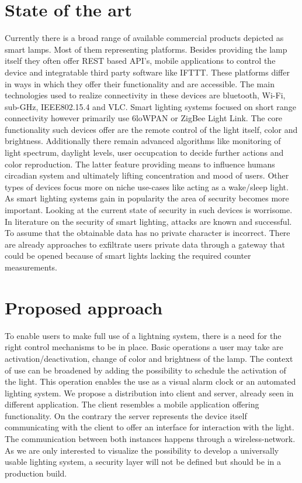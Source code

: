 \documentclass[conference]{IEEEtran}
\begin{document}
\section{State of the art}
Currently there is a broad range of available commercial products depicted as smart lamps. Most of them representing platforms.
Besides providing the lamp itself they often offer REST based API's, mobile applications to control the device and integratable
third party software like IFTTT. These platforms differ in ways in which they offer their functionality and are accessible.
The main technologies used to realize connectivity in these devices are bluetooth, Wi-Fi, sub-GHz, IEEE802.15.4 and VLC. 
Smart lighting systems focused on short range connectivity however primarily use 6loWPAN or ZigBee Light Link. The core
functionality such devices offer are the remote control of the light itself, color and brightness. Additionally there remain advanced
algorithms like monitoring of light spectrum, daylight levels, user occupcation to decide further actions and color reproduction. \cite{higuera2018}
The latter feature providing means to influence humans circadian system and ultimately lifting concentration and mood of users.
Other types of devices focus more on niche use-cases like \cite{nur2018,philips19} acting as a wake/sleep light. As smart lighting
systems gain in popularity the area of security becomes more important. Looking at the current state of security in such devices is
worrisome. In literature on the security of smart lighting, attacks are known and successful. \cite{Morgner2017,Eichelberger2015}
To assume that the obtainable data has no private character is incorrect. There are already approaches to exfiltrate
users private data through a gateway that could be opened because of smart lights lacking the required counter measurements. \cite{Maiti2018}

\section{Proposed approach}
To enable users to make full use of a lightning system, there is a need for the right control mechanisms to be in place.
Basic operations a user may take are activation/deactivation, change of color and brightness of the lamp. The context of use can
be broadened by adding the possibility to schedule the activation of the light. This operation enables the use as a visual alarm
clock or an automated lighting system.
We propose a distribution into client and server, already seen in different application. The client resembles a mobile application
offering functionality. On the contrary the server represents the device itself communicating with the client to offer an interface for
interaction with the light.
The communication between both instances happens through a wireless-network. 
As we are only interested to visualize the possibility
to develop a universally usable lighting system, a security layer will not be defined but should be in a production build.
\end{document}
